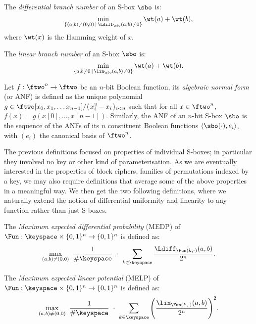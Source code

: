 \begin{defi}
The \emph{differential branch number} of an S-box $\sbo$ is:
\[
\min_{\{(a,b) \neq (0,0) \,|\, \Ldiff_{\sbo}(a,b) \neq 0\}} \wt(a) + \wt(b),
\]
where $\wt(x)$ is the Hamming weight of $x$.
\end{defi}

\begin{defi}
The \emph{linear branch number} of an S-box $\sbo$ is:
\[
\min_{\{a,b\neq 0\, |\, \lin_{\sbo}(a,b) \neq 0\}} \wt(a) + \wt(b).
\]

\end{defi}

\begin{defi}
Let $f : \ftwo^n \rightarrow \ftwo$ be an $n$-bit Boolean function, its \emph{algebraic normal form}
(or ANF) is defined as the unique polynomial $g \in \ftwo[x_0,x_1,\ldots x_{n-1}]/\langle\,x_i^2-x_i\,\rangle_{i<n}$
such that for all $x \in \ftwo^n$, $f(x) = g(x[0],\ldots,\allowbreak x[n-1])$.
Similarly, the ANF of an $n$-bit S-box $\sbo$
is the sequence of the ANFs of its $n$ constituent Boolean
functions $\langle\sbo(\cdot),e_i\rangle$, with $(e_i)$ the canonical basis of $\ftwo^n$.
\end{defi}

The previous definitions focused on properties of individual S-boxes; in particular they involved
no key or other kind of parameterisation. As we are eventually interested in the properties of block ciphers,
\ie families of permutations indexed by a key, we may also require definitions that average
some of the above properties in a meaningful way.
We then get the two following definitions, where we naturally
extend the notion of differential uniformity and linearity to any function rather than just
S-boxes.

\begin{defi}
\label{diffC}
The \emph{Maximum expected differential probability} (MEDP) of
$\Fun : \keyspace \times \{0,1\}^n \rightarrow \{0,1\}^n$ is defined as:
\[
\max_{(a,b) \neq (0,0)} ~ \frac{1}{\#\keyspace}~\cdot~ \sum_{k \in \keyspace} \frac{\Ldiff_{\Fun(k,\cdot)}(a,b)}{2^n}.
\]
\end{defi}

\begin{defi}
\label{linC}
The \emph{Maximum expected linear potential} (MELP) of
$\Fun : \keyspace \times \{0,1\}^n \rightarrow \{0,1\}^n$ is defined as:
\[
\max_{(a,b) \neq (0,0)} ~ \frac{1}{\#\keyspace}~\cdot~ \sum_{k \in \keyspace} \Bigg(\frac{\lin_{\Fun(k,\cdot)}(a,b)}{2^n}\Bigg)^2.
\]
\end{defi}

